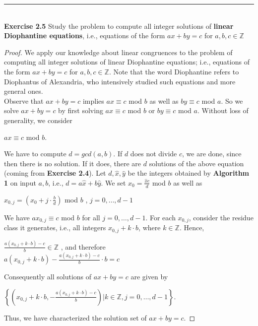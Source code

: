 \documentclass[a4paper]{article}
\begin{document}
\begin{samepage}
\noindent\rule{12cm}{0.4pt}\\
\noindent \textbf{Exercise 2.5} Study the problem to compute all integer solutions of \textbf{linear Diophantine equations}, i.e., equations of the form $ax + by = c$ for $a, b, c \in \mathbb{Z}$
\begin{proof}
We apply our knowledge about linear congruences to the problem of computing all integer solutions of linear Diophantine equations; i.e., equations of the form $ax + by = c$ for $a, b, c \in \mathbb{Z}$. Note that the word Diophantine refers to Diophantus of Alexandria, who intensively studied such equations and more general ones.\\
Observe that $ax + by = c$ implies $ax \equiv c$ mod $b$ as well as $by \equiv c$ mod $a$. So we solve $ax + by = c$ by first solving $ax \equiv c$ mod $b$ or $by \equiv c$ mod $a$. Without loss of generality, we consider\\
\begin{center}
$ax \equiv c$ mod $b$.
\end{center} 
We have to compute $d = gcd(a,b)$. If $d$ does not divide $c$, we are done, since then there is no solution. If it does, there are $d$ solutions of the above equation (coming from \textbf{Exercise 2.4}). Let $d, \hat{x}, \hat{y}$ be the integers obtained by \textbf{Algorithm 1} on input $a, b$, i.e., $d = a \hat{x} + b \hat{y}$. We set $x_{0} = \frac{\hat{x}c}{d}$ mod $b$ as well as
\begin{center}
$x_{0, j} = \left( x_{0} + j \cdot \frac{b}{d} \right)$ mod $b$ , $j = 0, \ldots, d - 1$
\end{center}
We have $ax_{0,j} \equiv c$ mod $b$ for all $j = 0, \ldots, d- 1$. For each $x_{0,j}$, consider the residue class it generates, i.e., all integers $x_{0,j} + k \cdot b$, where $k \in \mathbb{Z}$. Hence,
\begin{center}
$\frac{a(x_{0,j} + k \cdot b) - c}{b} \in \mathbb{Z}$ , and therefore \\
$a(x_{0, j} + k \cdot b) - \frac{a(x_{0, j} + k \cdot b) - c}{b} \cdot b = c$
\end{center}
Consequently all solutions of $ax + by = c$ are given by
\begin{center}
$\left\lbrace \left( x_{0, j} + k \cdot b, - \frac{a(x_{0,j} + k \cdot b) - c}{b} \right) | k \in \mathbb{Z}, j = 0, \ldots, d - 1 \right\rbrace$.
\end{center}
Thus, we have characterized the solution set of $ax + by = c$.
\end{proof}
\end{samepage}
\end{document}

